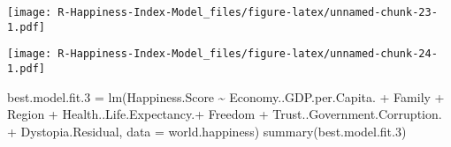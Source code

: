 \documentclass[
]{article}
\newenvironment{Shaded}{\begin{snugshade}}{\end{snugshade}}
\newcommand{\AttributeTok}[1]{\textcolor[rgb]{0.77,0.63,0.00}{#1}}
\newcommand{\FloatTok}[1]{\textcolor[rgb]{0.00,0.00,0.81}{#1}}
\newcommand{\FunctionTok}[1]{\textcolor[rgb]{0.00,0.00,0.00}{#1}}
\newcommand{\NormalTok}[1]{#1}
\newcommand{\OtherTok}[1]{\textcolor[rgb]{0.56,0.35,0.01}{#1}}
\newcommand{\SpecialCharTok}[1]{\textcolor[rgb]{0.00,0.00,0.00}{#1}}
\begin{document}
\begin{Shaded}
\end{Shaded}

\texttt{[image: R-Happiness-Index-Model\_files/figure-latex/unnamed-chunk-23-1.pdf]}

\begin{Shaded}
\end{Shaded}

\texttt{[image: R-Happiness-Index-Model\_files/figure-latex/unnamed-chunk-24-1.pdf]}

\begin{Shaded}
\begin{Highlighting}[]
\NormalTok{best.model.fit}\FloatTok{.3} \OtherTok{=} \FunctionTok{lm}\NormalTok{(Happiness.Score }\SpecialCharTok{\textasciitilde{}}\NormalTok{ Economy..GDP.per.Capita. }\SpecialCharTok{+}\NormalTok{ Family }\SpecialCharTok{+}\NormalTok{ Region }\SpecialCharTok{+}\NormalTok{ Health..Life.Expectancy.}\SpecialCharTok{+}\NormalTok{  Freedom }\SpecialCharTok{+}\NormalTok{ Trust..Government.Corruption. }\SpecialCharTok{+}\NormalTok{ Dystopia.Residual, }\AttributeTok{data =}\NormalTok{ world.happiness)}
\FunctionTok{summary}\NormalTok{(best.model.fit}\FloatTok{.3}\NormalTok{)}
\end{Highlighting}
\end{Shaded}
\end{document}
